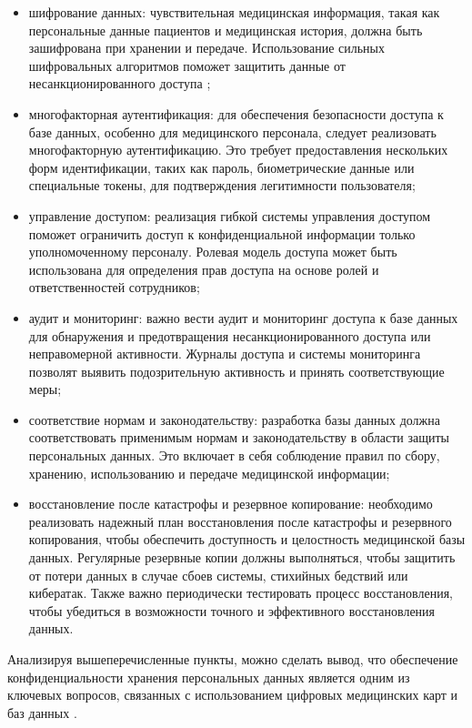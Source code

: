 \begin{itemize}
    \item шифрование данных: чувствительная медицинская информация, такая как персональные данные пациентов и медицинская история, должна быть зашифрована при хранении и передаче. Использование сильных шифровальных алгоритмов поможет защитить данные от несанкционированного доступа \cite{online11};
    \item многофакторная аутентификация: для обеспечения безопасности доступа к базе данных, особенно для медицинского персонала, следует реализовать многофакторную аутентификацию. Это требует предоставления нескольких форм идентификации, таких как пароль, биометрические данные или специальные токены, для подтверждения легитимности пользователя;
    \item управление доступом: реализация гибкой системы управления доступом поможет ограничить доступ к конфиденциальной информации только уполномоченному персоналу. Ролевая модель доступа может быть использована для определения прав доступа на основе ролей и ответственностей сотрудников;
    \item аудит и мониторинг: важно вести аудит и мониторинг доступа к базе данных для обнаружения и предотвращения несанкционированного доступа или неправомерной активности. Журналы доступа и системы мониторинга позволят выявить подозрительную активность и принять соответствующие меры;
    \item соответствие нормам и законодательству: разработка базы данных должна соответствовать применимым нормам и законодательству в области защиты персональных данных. Это включает в себя соблюдение правил по сбору, хранению, использованию и передаче медицинской информации;
    \item восстановление после катастрофы и резервное копирование: необходимо реализовать надежный план восстановления после катастрофы и резервного копирования, чтобы обеспечить доступность и целостность медицинской базы данных. Регулярные резервные копии должны выполняться, чтобы защитить от потери данных в случае сбоев системы, стихийных бедствий или кибератак. Также важно периодически тестировать процесс восстановления, чтобы убедиться в возможности точного и эффективного восстановления данных.
\end{itemize}

Анализируя вышеперечисленные пункты, можно сделать вывод, что обеспечение конфиденциальности хранения персональных данных является одним из ключевых вопросов, связанных с использованием цифровых медицинских карт и баз данных \cite{online6}.

